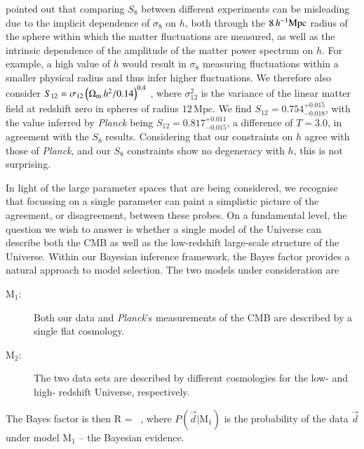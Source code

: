 \citet{Sanchez2020} pointed out that comparing $S_{8}$ between different experiments can be misleading due to the implicit dependence of $\sigma_{8}$ on $h$, both through the $8\,h^{-1}{\rm Mpc}$ radius of the sphere within which the matter fluctuations are measured, as well as the intrinsic dependence of the amplitude of the matter power spectrum on $h$. 
For example, a high value of $h$ would result in $\sigma_{8}$ measuring fluctuations within a smaller physical radius and thus infer higher fluctuations. 
We therefore also consider $S_{12} = \sigma_{12}\left(\Omega_{\rm m}\,h^2/0.14\right)^{0.4}$ \citep{Sanchez2020}, where $\sigma_{12}^{2}$ is the variance of the linear matter field at redshift zero in spheres of radius $12\,\mathrm{Mpc}$.
We find $S_{12} = 0.754^{+0.015}_{-0.018}$, with the value inferred by {\it Planck} being $S_{12} = 0.817_{-0.015}^{+0.011}
$, a difference of $T=3.0$, in agreement with the $S_8$ results. 
Considering that our \tttp constraints on $h$ agree with those of {\it Planck}, and our $S_{8}$ constraints show no degeneracy with $h$, this is not surprising.

In light of the large parameter spaces that are being considered, we recognise that focussing on a single parameter can paint a simplistic picture of the agreement, or disagreement, between these probes.
On a fundamental level, the question we wish to answer is whether a single model of the Universe can describe both the CMB as well as the low-redshift large-scale structure of the Universe.
Within our Bayesian inference framework, the Bayes factor provides a natural approach to model selection. 
The two models under consideration are 
\begin{description}
	\item[$\mathrm{M}_1$:] Both our \tttp data and {\it Planck}'s measurements of the CMB are described by a single flat \LCDM cosmology.
	\item[$\mathrm{M}_2$:] The two data sets are described by different cosmologies for the low- and high- redshift Universe, respectively.
\end{description}
The Bayes factor is then
\be
\label{equ:bayes-factor}
	R =  \ ,
\ee
where $P(\vec d | \mathrm{M}_1)$ is the probability of the data $\vec d$ under model $\mathrm{M}_1$ -- the Bayesian evidence. 

